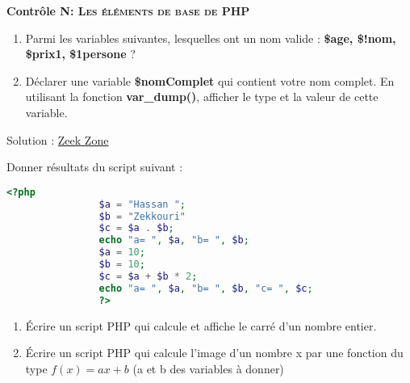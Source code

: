 \documentclass[10pt,a4paper,notitlepage]{article}
\begin{document}
	
	\begin{center}
		\large{\textbf{Contrôle N: \textsc{Les éléments de base de PHP}}}
	\end{center}
	\begin{definition}
		\hspace{2ex} 
		\begin{enumerate}
			\item Parmi les variables suivantes, lesquelles ont un nom valide : \textbf{{\color{dkgreen} \$age, \$!nom, \$prix1, \$1persone }}?
			\item Déclarer une variable \textbf{{\color{dkgreen} \$nomComplet}} qui contient votre nom complet. En utilisant la fonction \textbf{{\color{violet} var\_dump()}}, afficher le type et la valeur de cette variable.
		\end{enumerate}
		Solution : \href{https://www.youtube.com/watch?v=OVFLx9-yfiw&list=PLF2W_rB6QiYBYg4-19vGs8TMTS3GbHM0H&index=1}{\color{blue} Zeek Zone}
	\end{definition}
	
	\begin{definition}
		\hspace{2ex} Donner résultats du script suivant :
		\begin{center}
			\begin{lstlisting}[language=PHP]
				<?php
				$a = "Hassan ";
				$b = "Zekkouri"
				$c = $a . $b;
				echo "a= ", $a, "b= ", $b;
				$a = 10;
				$b = 10;
				$c = $a + $b * 2;
				echo "a= ", $a, "b= ", $b, "c= ", $c;
				?> 
			\end{lstlisting}
		\end{center}
	\end{definition}

	\begin{definition}
		\hspace{2ex} 
		\begin{enumerate}
			\item Écrire un script PHP qui calcule et affiche le carré d'un nombre entier.
			\item Écrire un script PHP qui calcule l’image d’un nombre x par une fonction du type
			$f(x) = ax + b$ (a et b des variables à donner)
		\end{enumerate}
	\end{definition}
	
	
	
\end{document}
